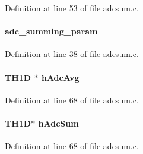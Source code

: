Definition at line 53 of file adcsum.c.
\paragraph[{adc\_\-summing\_\-param}]{ {\bf adc\_\-summing\_\-param}}\hfill\label{adcsum_8c_a2b6d31f6ef3ff3d2d8591890fc419bdf}


Definition at line 38 of file adcsum.c.
\paragraph[{hAdcAvg}]{\setlength{\rightskip}{0pt plus 5cm}TH1D $\ast$ {\bf hAdcAvg}}\hfill\label{adcsum_8c_a9f9e9d41dc2d6fe9be3a458841d40666}


Definition at line 68 of file adcsum.c.
\paragraph[{hAdcSum}]{\setlength{\rightskip}{0pt plus 5cm}TH1D$\ast$ {\bf hAdcSum}}\hfill\label{adcsum_8c_aba6afd881740f71b5a57bd2a9257b7b5}


Definition at line 68 of file adcsum.c.